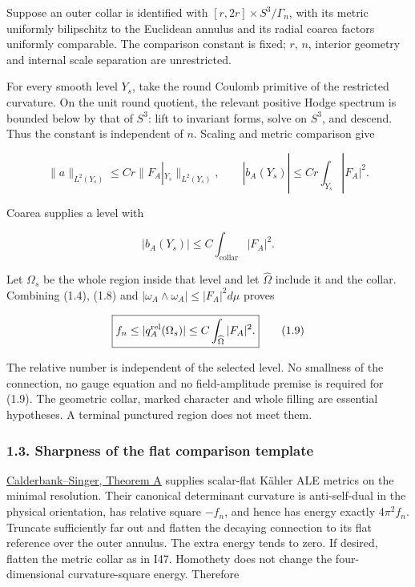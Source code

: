 \documentclass[
  11pt,
]{article}
\begin{document}
Suppose an outer collar is identified with
\([r,2r]\times S^3/\Gamma_n\), with its metric uniformly bilipschitz to
the Euclidean annulus and its radial coarea factors uniformly
comparable. The comparison constant is fixed; \(r\), \(n\), interior
geometry and internal scale separation are unrestricted.

For every smooth level \(Y_s\), take the round Coulomb primitive of the
restricted curvature. On the unit round quotient, the relevant positive
Hodge spectrum is bounded below by that of \(S^3\): lift to invariant
forms, solve on \(S^3\), and descend. Thus the constant is independent
of \(n\). Scaling and metric comparison give

\[
 \|a\|_{L^2(Y_s)}\le Cr\|F_A|_{Y_s}\|_{L^2(Y_s)},\qquad
 |b_A(Y_s)|\le Cr\int_{Y_s}|F_A|^2.
 \tag{1.7}
\]

Coarea supplies a level with

\[
 |b_A(Y_s)|\le C\int_{\text{collar}}|F_A|^2.
 \tag{1.8}
\]

Let \(\Omega_s\) be the whole region inside that level and let
\(\widehat\Omega\) include it and the collar. Combining (1.4), (1.8) and
\(|\omega_A\wedge\omega_A|\le|F_A|^2d\mu\) proves

\[
 \boxed{f_n\le |q_A^{\rm rel}(\Omega_s)|
               \le C\int_{\widehat\Omega}|F_A|^2.}
 \tag{1.9}
\]

The relative number is independent of the selected level. No smallness
of the connection, no gauge equation and no field-amplitude premise is
required for (1.9). The geometric collar, marked character and whole
filling are essential hypotheses. A terminal punctured region does not
meet them.

\hypertarget{sharpness-of-the-flat-comparison-template}{%
\subsubsection{1.3. Sharpness of the flat comparison
template}\label{sharpness-of-the-flat-comparison-template}}

\href{https://arxiv.org/html/math/0206229}{Calderbank--Singer, Theorem
A} supplies scalar-flat Kähler ALE metrics on the minimal resolution.
Their canonical determinant curvature is anti-self-dual in the physical
orientation, has relative square \(-f_n\), and hence has energy exactly
\(4\pi^2f_n\). Truncate sufficiently far out and flatten the decaying
connection to its flat reference over the outer annulus. The extra
energy tends to zero. If desired, flatten the metric collar as in I47.
Homothety does not change the four-dimensional curvature-square energy.
Therefore
\end{document}
